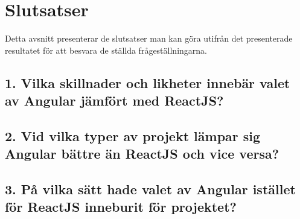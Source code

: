 \section{Slutsatser}
\label{sec:axel-conclusion}

Detta avsnitt presenterar de slutsatser man kan göra utifrån det presenterade resultatet för att besvara de ställda frågeställningarna.

\subsection*{1. Vilka skillnader och likheter innebär valet av Angular jämfört med ReactJS?}

\subsection*{2. Vid vilka typer av projekt lämpar sig Angular bättre än ReactJS och vice versa?}
 
\subsection*{3. På vilka sätt hade valet av Angular istället för ReactJS inneburit för projektet?}
